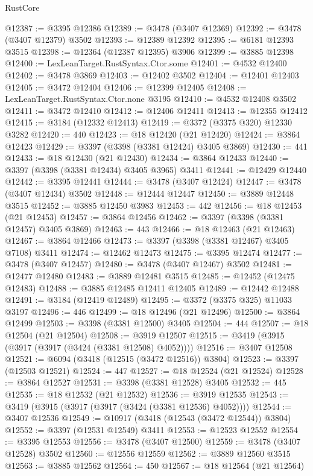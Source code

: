\begin{lexlean}{RustCore}
\begin{coremodule}
@12387 := @3395 @12386
@12389 := @3478 (@3407 @12369)
@12392 := @3478 (@3407 @12379) @3502
@12393 := @12389 @12392
@12395 := @6181 @12393 @3515
@12398 := @12364 (@12387 @12395) @3906
@12399 := @3885 @12398
@12400 := LexLeanTarget.RustSyntax.Ctor.some
@12401 := @4532 @12400
@12402 := @3478 @3869
@12403 := @12402 @3502
@12404 := @12401 @12403
@12405 := @3472 @12404
@12406 := @12399 @12405
@12408 := LexLeanTarget.RustSyntax.Ctor.none @3195
@12410 := @4532 @12408 @3502
@12411 := @3472 @12410
@12412 := @12406 @12411
@12413 := @12355 @12412
@12415 := @3184 (@12332 @12413)
@12419 := @3372 (@3375 @320) @12330 @3282
@12420 := 440
@12423 := @18 @12420 (@21 @12420)
@12424 := @3864 @12423
@12429 := @3397 (@3398 (@3381 @12424) @3405 @3869)
@12430 := 441
@12433 := @18 @12430 (@21 @12430)
@12434 := @3864 @12433
@12440 := @3397 (@3398 (@3381 @12434) @3405 @3965) @3411
@12441 := @12429 @12440
@12442 := @3395 @12441
@12444 := @3478 (@3407 @12424)
@12447 := @3478 (@3407 @12434) @3502
@12448 := @12444 @12447
@12450 := @3889 @12448 @3515
@12452 := @3885 @12450 @3983
@12453 := 442
@12456 := @18 @12453 (@21 @12453)
@12457 := @3864 @12456
@12462 := @3397 (@3398 (@3381 @12457) @3405 @3869)
@12463 := 443
@12466 := @18 @12463 (@21 @12463)
@12467 := @3864 @12466
@12473 := @3397 (@3398 (@3381 @12467) @3405 @7108) @3411
@12474 := @12462 @12473
@12475 := @3395 @12474
@12477 := @3478 (@3407 @12457)
@12480 := @3478 (@3407 @12467) @3502
@12481 := @12477 @12480
@12483 := @3889 @12481 @3515
@12485 := @12452 (@12475 @12483)
@12488 := @3885 @12485 @12411 @12405
@12489 := @12442 @12488
@12491 := @3184 (@12419 @12489)
@12495 := @3372 (@3375 @325) @11033 @3197
@12496 := 446
@12499 := @18 @12496 (@21 @12496)
@12500 := @3864 @12499
@12503 := @3398 (@3381 @12500) @3405
@12504 := 444
@12507 := @18 @12504 (@21 @12504)
@12508 := @3919 @12507
@12515 := @3419 (@3915 (@3917 (@3917 (@3424 (@3381 @12508) @4052))))
@12516 := @3407 @12508
@12521 := @6094 (@3418 (@12515 (@3472 @12516)) @3804)
@12523 := @3397 (@12503 @12521)
@12524 := 447
@12527 := @18 @12524 (@21 @12524)
@12528 := @3864 @12527
@12531 := @3398 (@3381 @12528) @3405
@12532 := 445
@12535 := @18 @12532 (@21 @12532)
@12536 := @3919 @12535
@12543 := @3419 (@3915 (@3917 (@3917 (@3424 (@3381 @12536) @4052))))
@12544 := @3407 @12536
@12549 := @10917 (@3418 (@12543 (@3472 @12544)) @3804)
@12552 := @3397 (@12531 @12549) @3411
@12553 := @12523 @12552
@12554 := @3395 @12553
@12556 := @3478 (@3407 @12500)
@12559 := @3478 (@3407 @12528) @3502
@12560 := @12556 @12559
@12562 := @3889 @12560 @3515
@12563 := @3885 @12562
@12564 := 450
@12567 := @18 @12564 (@21 @12564)

\end{coremodule}
\end{lexlean}
